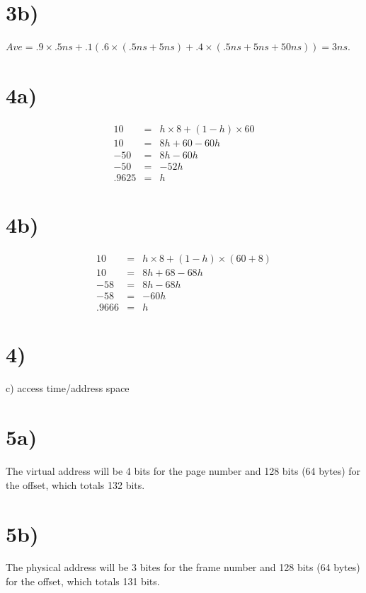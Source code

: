 \documentclass[a4paper,11pt]{article}
\begin{document}
\section*{3b)}
$ Ave = .9 \times .5ns + .1 (.6 \times (.5ns + 5ns) + .4 \times (.5ns + 5ns + 50ns)) = 3 ns$.


\section*{4a)}
\begin{eqnarray}
10 &=& h \times 8 + (1-h) \times 60 \\
10 &=& 8 h + 60 - 60 h \\
-50 &=& 8 h - 60 h \\
-50 &=& -52 h \\
.9625 &=& h
\end{eqnarray}

\section*{4b)}
\begin{eqnarray}
10 &=& h \times 8 + (1-h) \times (60 + 8) \\
10 &=& 8 h + 68 - 68 h \\
-58 &=& 8 h - 68 h \\
-58 &=& -60 h \\
.9666 &=& h
\end{eqnarray}


\section*{4)}
c) access time/address space


\section*{5a)}
The virtual address will be 4 bits for the page number and 128 bits (64 bytes) for the offset, which totals 132 bits.

\section*{5b)}
The physical address will be 3 bites for the frame number and 128 bits (64 bytes) for the offset, which totals 131 bits.
\end{document}
